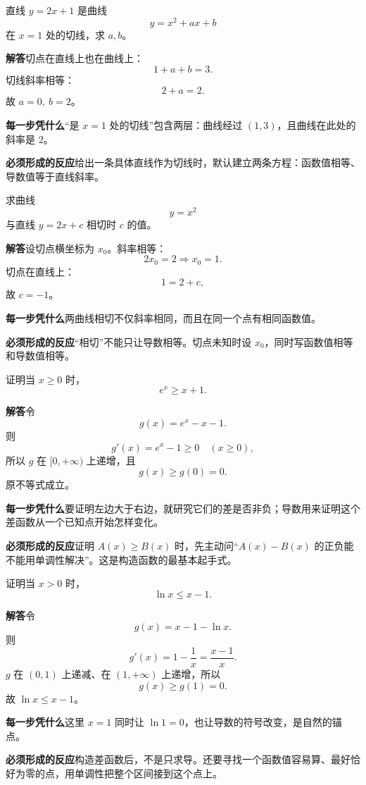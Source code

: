 \documentclass[11pt,fontset=fandol]{ctexart}
\newcommand{\answer}{\par\textbf{解答}\quad}
\newcommand{\basis}{\par\textbf{每一步凭什么}\quad}
\newcommand{\reaction}{\par\textbf{必须形成的反应}\quad}
\newenvironment{drill}[2]{
  \begin{tcolorbox}[colback=white,colframe=black!35,title={#1\quad\small #2},breakable]
}{\end{tcolorbox}}
\begin{document}
\begin{drill}{33. 求参数切线时，函数值和导数值是两条条件}{项目导数题库改编}
直线 $y=2x+1$ 是曲线
\[
y=x^2+ax+b
\]
在 $x=1$ 处的切线，求 $a,b$。

\answer 切点在直线上也在曲线上：
\[
1+a+b=3.
\]
切线斜率相等：
\[
2+a=2.
\]
故 $a=0,\ b=2$。

\basis “是 $x=1$ 处的切线”包含两层：曲线经过 $(1,3)$，且曲线在此处的斜率是 $2$。

\reaction 给出一条具体直线作为切线时，默认建立两条方程：函数值相等、导数值等于直线斜率。
\end{drill}

\begin{drill}{34. 切点未知时不要只列斜率条件}{项目导数题库改编}
求曲线
\[
y=x^2
\]
与直线 $y=2x+c$ 相切时 $c$ 的值。

\answer 设切点横坐标为 $x_0$。斜率相等：
\[
2x_0=2\Longrightarrow x_0=1.
\]
切点在直线上：
\[
1=2+c,
\]
故 $c=-1$。

\basis 两曲线相切不仅斜率相同，而且在同一个点有相同函数值。

\reaction “相切”不能只让导数相等。切点未知时设 $x_0$，同时写函数值相等和导数值相等。
\end{drill}

\begin{drill}{35. 证明不等式先把目标移成函数}{项目导数题库构造题改编}
证明当 $x\ge0$ 时，
\[
e^x\ge x+1.
\]

\answer 令
\[
g(x)=e^x-x-1.
\]
则
\[
g'(x)=e^x-1\ge0\quad(x\ge0),
\]
所以 $g$ 在 $[0,+\infty)$ 上递增，且
\[
g(x)\ge g(0)=0.
\]
原不等式成立。

\basis 要证明左边大于右边，就研究它们的差是否非负；导数用来证明这个差函数从一个已知点开始怎样变化。

\reaction 证明 $A(x)\ge B(x)$ 时，先主动问“$A(x)-B(x)$ 的正负能不能用单调性解决”。这是构造函数的最基本起手式。
\end{drill}

\begin{drill}{36. 构造函数后，锚点要选能算出零的点}{项目导数题库构造题改编}
证明当 $x>0$ 时，
\[
\ln x\le x-1.
\]

\answer 令
\[
g(x)=x-1-\ln x.
\]
则
\[
g'(x)=1-\frac1x=\frac{x-1}{x}.
\]
$g$ 在 $(0,1)$ 上递减、在 $(1,+\infty)$ 上递增，所以
\[
g(x)\ge g(1)=0.
\]
故 $\ln x\le x-1$。

\basis 这里 $x=1$ 同时让 $\ln1=0$，也让导数的符号改变，是自然的锚点。

\reaction 构造差函数后，不是只求导。还要寻找一个函数值容易算、最好恰好为零的点，用单调性把整个区间接到这个点上。
\end{drill}
\end{document}
